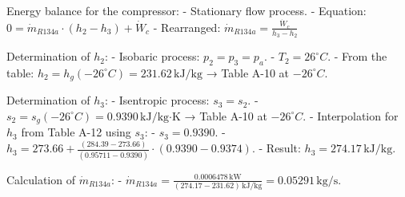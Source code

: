 Energy balance for the compressor:  
- Stationary flow process.  
- Equation:  
  \( 0 = \dot{m}_{R134a} \cdot (h_2 - h_3) + \dot{W}_c \)  
- Rearranged:  
  \( \dot{m}_{R134a} = \frac{\dot{W}_c}{h_3 - h_2} \)  

Determination of \( h_2 \):  
- Isobaric process: \( p_2 = p_3 = p_a \).  
- \( T_2 = 26^\circ C \).  
- From the table:  
  \( h_2 = h_g(-26^\circ C) = 231.62 \, \text{kJ/kg} \) → Table A-10 at \( -26^\circ C \).  

Determination of \( h_3 \):  
- Isentropic process: \( s_3 = s_2 \).  
- \( s_2 = s_g(-26^\circ C) = 0.9390 \, \text{kJ/kg·K} \) → Table A-10 at \( -26^\circ C \).  
- Interpolation for \( h_3 \) from Table A-12 using \( s_3 \):  
  - \( s_3 = 0.9390 \).  
  - \( h_3 = 273.66 + \frac{(284.39 - 273.66)}{(0.95711 - 0.9390)} \cdot (0.9390 - 0.9374) \).  
  - Result: \( h_3 = 274.17 \, \text{kJ/kg} \).  

Calculation of \( \dot{m}_{R134a} \):  
- \( \dot{m}_{R134a} = \frac{0.0006478 \, \text{kW}}{(274.17 - 231.62) \, \text{kJ/kg}} = 0.05291 \, \text{kg/s} \).